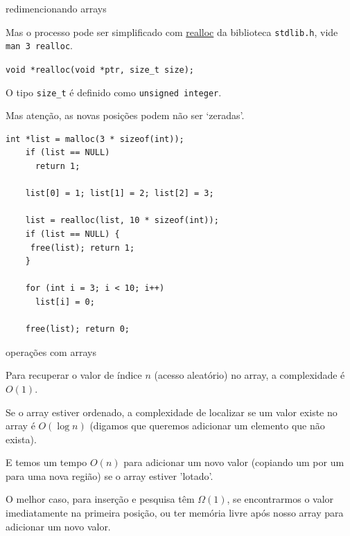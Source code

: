 \documentclass{beamer}
\begin{document}
\begin{frame}{redimencionando arrays}

  Mas o processo pode ser simplificado com
  \href{https://linux.die.net/man/3/realloc}{realloc} da biblioteca
  \texttt{stdlib.h}, vide \texttt{man 3 realloc}.

  \texttt{void *realloc(void *ptr, size\_t size);}

  O tipo \texttt{size\_t} é definido como {\color{teal} \texttt{unsigned integer}}.

  Mas atenção, as novas posições podem não ser `zeradas'.

  \framebreak

  \begin{lstlisting}[style=normalc,caption=src/list2.c]
    int *list = malloc(3 * sizeof(int));
    if (list == NULL)
      return 1;

    list[0] = 1; list[1] = 2; list[2] = 3;

    list = realloc(list, 10 * sizeof(int));
    if (list == NULL) {
     free(list); return 1;
    }

    for (int i = 3; i < 10; i++)
      list[i] = 0;

    free(list); return 0;
  \end{lstlisting}
  
\end{frame}


\begin{frame}[allowframebreaks]{operações com arrays}

  Para recuperar o valor de índice $n$ (acesso aleatório) no array, a
  complexidade é $O(1)$.

  Se o array estiver ordenado, a complexidade de localizar se um valor
  existe no array é $O(\log n)$ (digamos que queremos adicionar um
  elemento que não exista).

  E temos um tempo $O(n)$ para adicionar um novo valor (copiando um
  por um para uma nova região) se o array estiver 'lotado'.

  O melhor caso, para inserção e pesquisa têm $\Omega(1)$, se
  encontrarmos o valor imediatamente na primeira posição, ou ter
  memória livre após nosso array para adicionar um novo valor.

\end{frame}
\end{document}
